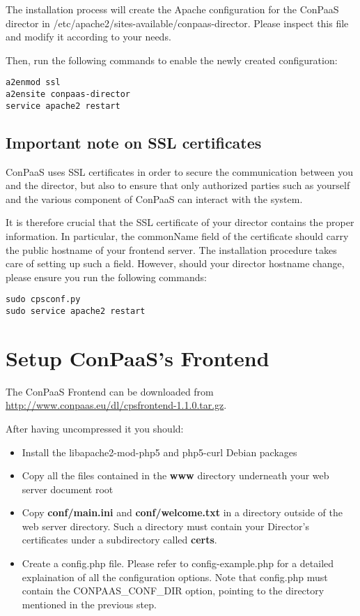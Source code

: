 \documentclass[10pt]{article}
\begin{document}
The installation process will create the Apache configuration for the ConPaaS
director in /etc/apache2/sites-available/conpaas-director. Please inspect this
file and modify it according to your needs.

Then, run the following commands to enable the newly created configuration:

\begin{verbatim}
a2enmod ssl
a2ensite conpaas-director
service apache2 restart
\end{verbatim}

\subsection{Important note on SSL certificates}
ConPaaS uses SSL certificates in order to secure the communication between you
and the director, but also to ensure that only authorized parties such as
yourself and the various component of ConPaaS can interact with the system.

It is therefore crucial that the SSL certificate of your director contains the
proper information. In particular, the commonName field of the certificate
should carry the public hostname of your frontend server. The installation
procedure takes care of setting up such a field. However, should your director
hostname change, please ensure you run the following commands:

\begin{verbatim}
sudo cpsconf.py
sudo service apache2 restart
\end{verbatim}

\section{Setup ConPaaS's Frontend}
\label{sec:frontend}

The ConPaaS Frontend can be downloaded from
\url{http://www.conpaas.eu/dl/cpsfrontend-1.1.0.tar.gz}.

After having uncompressed it you should:

\begin{itemize}
\item Install the libapache2-mod-php5 and php5-curl Debian packages
\item Copy all the files contained in the \textbf{www} directory underneath your web server document root
\item Copy \textbf{conf/main.ini} and \textbf{conf/welcome.txt} in a directory
  outside of the web server directory. Such a directory must contain your
  Director's certificates under a subdirectory called \textbf{certs}.
\item Create a config.php file. Please refer to
  config-example.php for a detailed explaination of all the configuration
  options. Note that config.php must contain the CONPAAS\_CONF\_DIR option,
  pointing to the directory mentioned in the previous step.
\end{itemize}
\end{document}
